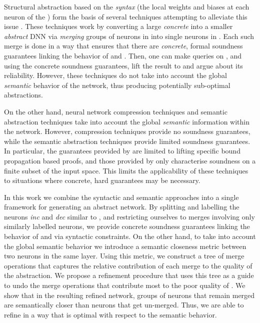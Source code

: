 Structural abstraction based on the \textit{syntax} (the local weights and
biases at each
neuron of the \dnn) form the basis of several techniques attempting to alleviate
this issue \cite{cegar-nn, cegarette, cleverest-nn, conv-abs-gk}. These
techniques work by converting a large \textit{concrete} \dnn \cnc into a smaller
\textit{abstract} DNN \abs via \textit{merging} groups of neurons in \cnc into
single neurons in \abs. Each such
merge is done in a way that ensures that there are \textit{concrete}, formal
soundness guarantees linking the behavior of \cnc and \abs. Then, one can make 
queries on \abs, and using the concrete soundness guarantees, lift the result to 
\cnc and argue about its reliability. However, these techniques
do not take into account the global \textit{semantic} behavior of the network,
thus producing potentially sub-optimal abstractions.

On the other hand, neural network compression techniques \cite{dnn-compression}
and semantic abstraction techniques \cite{deep-abstract, lin-comb-abs-jan} take
into account the global \textit{semantic} information within the network.
However,
compression techniques provide no soundness guarantees, while the semantic
abstraction techniques provide limited soundness guarantees. In particular, the
guarantees provided by \cite{deep-abstract} are limited to lifting specific
bound propagation based proofs, and those provided by \cite{lin-comb-abs-jan}
only characterise soundness on a finite subset of the input space. This limits
the applicability of these techniques to situations where concrete, hard
guarantees may be necessary.

In this work we combine the syntactic and semantic approaches into a single
framework for generating an abstract network. By splitting and labelling the
neurons \textit{inc} and \textit{dec} similar to \cite{cegar-nn}, and
restricting ourselves to merges involving only similarly labelled neurons, we
provide concrete soundness guarantees linking the behavior of \cnc and \abs via
syntactic constraints.
On the other hand, to take into account the global semantic behavior we
introduce a semantic closeness metric between two neurons in the same layer.
Using this metric, we construct a tree of merge operations that 
captures the relative contribution of each merge to the quality of the
abstraction. We propose a refinement procedure that uses this
tree as a guide to undo the merge operations that
contribute most to the poor quality of \abs.  We show that in the resulting
refined network, groups of neurons that remain merged are semantically closer
than neurons that get un-merged. Thus, we are able to refine \abs in a way that
is optimal with respect to the semantic behavior.

